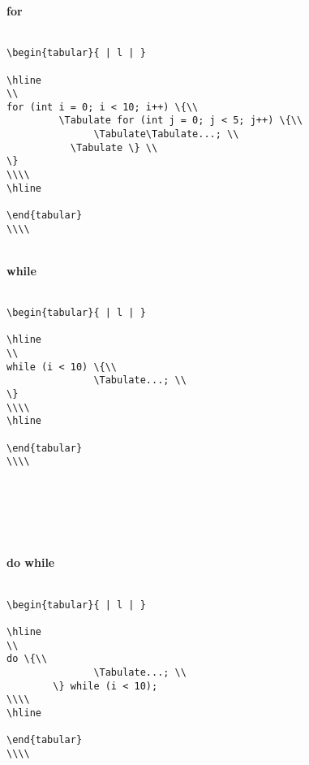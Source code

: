 \documentclass{article}
\begin{document}
\large \textbf{for}\\\\
\normalsize
\begin{lstlisting}
\begin{tabular}{ | l | }

\hline
\\
for (int i = 0; i < 10; i++) \{\\
         \Tabulate for (int j = 0; j < 5; j++) \{\\
               \Tabulate\Tabulate...; \\
           \Tabulate \} \\
\}
\\\\
\hline

\end{tabular}
\\\\
\end{lstlisting}
\\\large \textbf{while}\\\\
\normalsize
\begin{left}
\begin{lstlisting}
\begin{tabular}{ | l | }

\hline
\\
while (i < 10) \{\\
               \Tabulate...; \\
\}
\\\\
\hline

\end{tabular}
\\\\
\end{lstlisting}\\
\end{left}\\\\
\\\large \textbf{do while}\\\\
\begin{left}
\begin{lstlisting}
\begin{tabular}{ | l | }

\hline
\\
do \{\\
               \Tabulate...; \\
        \} while (i < 10);
\\\\
\hline

\end{tabular}
\\\\
\end{lstlisting}
\end{left}\
\end{document}
